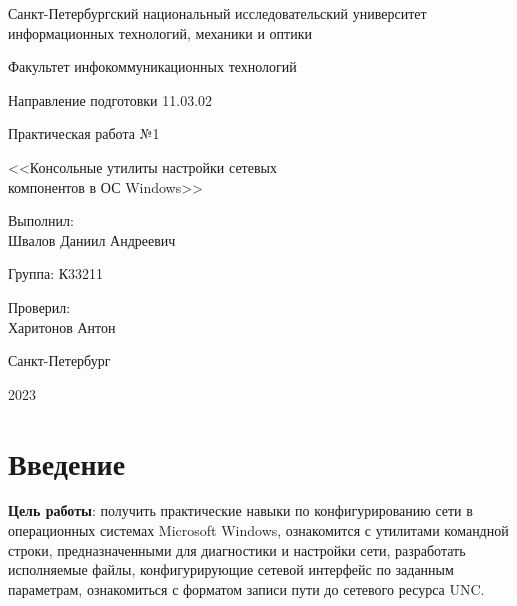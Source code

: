\documentclass[a4paper, 14pt]{extarticle}
\begin{document}
\begin{titlepage}
  \vspace{0pt plus2fill}
  \noindent

  \vspace{0pt plus6fill}
  \begin{center}
    Санкт-Петербургский национальный исследовательский университет
    информационных технологий, механики и оптики

    \vspace{0pt plus3fill}

    Факультет инфокоммуникационных технологий

    Направление подготовки 11.03.02

    \vspace{0pt plus2fill}

    Практическая работа №1

    <<Консольные утилиты настройки сетевых \\ компонентов в ОС Windows>>

  \end{center}

  \vspace{0pt plus9fill}
  \begin{flushright}
    Выполнил: \\
    Швалов Даниил Андреевич

    Группа: К33211

    Проверил: \\
    Харитонов Антон
  \end{flushright}

  \vspace{0pt plus2fill}
  \begin{center}
    Санкт-Петербург

    2023
  \end{center}
\end{titlepage}

\setcounter{page}{2}

\section{Введение}

\textbf{Цель работы}: получить практические навыки по конфигурированию сети в
операционных системах Microsoft Windows, ознакомится с утилитами командной
строки, предназначенными для диагностики и настройки сети, разработать
исполняемые файлы, конфигурирующие сетевой интерфейс по заданным параметрам,
ознакомиться с форматом записи пути до сетевого ресурса UNC.
\end{document}
